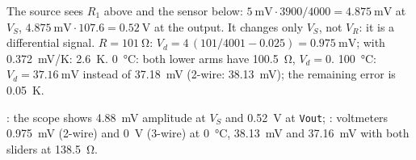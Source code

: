 \begin{solution}
\begin{talist}
\ta The source sees $R_1$ above and the sensor below: $\SI{5}{\milli\volt}\cdot 3900/4000 = \SI{4.875}{\milli\volt}$ at $V_S$,
	$\SI{4.875}{\milli\volt}\cdot 107.6 = \SI{0.52}{\volt}$ at the output. It changes only $V_S$, not $V_R$: it is a differential signal.
\ta $R = \SI{101}{\ohm}$: $V_d = 4\,(101/4001 - 0.025) = \SI{0.975}{\milli\volt}$; with \SI{0.372}{\milli\volt/\kelvin}: \SI{2.6}{\kelvin}.
\ta \SI{0}{\celsius}: both lower arms have \SI{100.5}{\ohm}, $V_d = 0$. \SI{100}{\celsius}: $V_d = \SI{37.16}{\milli\volt}$
	instead of \SI{37.18}{\milli\volt} (2-wire: \SI{38.13}{\milli\volt}); the remaining error is \SI{0.05}{\kelvin}.
\item[] : the scope shows \SI{4.88}{\milli\volt} amplitude at $V_S$ and \SI{0.52}{\volt} at \texttt{Vout};
	: voltmeters \SI{0.975}{\milli\volt} (2-wire) and \SI{0}{\volt} (3-wire) at \SI{0}{\celsius},
	\SI{38.13}{\milli\volt} and \SI{37.16}{\milli\volt} with both sliders at \SI{138.5}{\ohm}.
\end{talist}
\end{solution}


